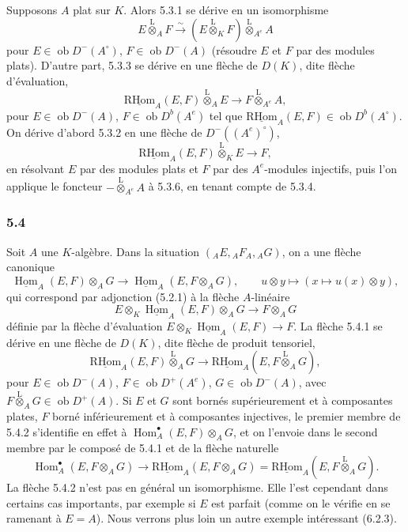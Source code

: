 \documentclass[11pt]{article}
\DeclareMathOperator{\Hom}{Hom}
\newcommand{\ob}{\operatorname{ob}}
\providecommand{\RHom}{\mathrm{RHom}}
\providecommand{\uRHom}{\underline{\RHom}}
\providecommand{\uHom}{\underline{\Hom}}
\providecommand{\lten}{\overset{\mathrm L}{\otimes}}
\providecommand{\RHom}{\mathrm{RHom}}
\providecommand{\Hom}{\operatorname{Hom}}
\providecommand{\ob}{\operatorname{ob}}
\providecommand{\lten}{\overset{\mathrm L}{\otimes}}
\providecommand{\RHom}{\mathrm R\mathcal{H}om}
\providecommand{\lten}{\overset{\mathrm L}{\otimes}}
\providecommand{\lten}{\overset{\mathrm L}{\otimes}}
\providecommand{\lten}{\overset{\mathrm L}{\otimes}}
\providecommand{\lten}{\overset{\mathrm L}{\otimes}}
\providecommand{\RHom}{\mathrm{RHom}}
\providecommand{\Hom}{\operatorname{Hom}}
\providecommand{\lten}{\overset{\mathrm L}{\otimes}}
\begin{document}
Supposons $A$ plat sur $K$. Alors 5.3.1 se dérive en un isomorphisme
\begin{equation}\tag{5.3.4}
E\lten_AF\xrightarrow{\sim}(E\lten_KF)\lten_{A^e}A
\end{equation}
pour $E\in\ob D^-(A^\circ)$, $F\in\ob D^-(A)$ (résoudre $E$ et $F$ par des modules plats). D'autre part, 5.3.3 se dérive en une flèche de $D(K)$, dite flèche d'évaluation,
\begin{equation}\tag{5.3.5}
\uRHom_A(E,F)\lten_AE\longrightarrow F\lten_{A^e}A,
\end{equation}
pour $E\in\ob D^-(A)$, $F\in\ob D^b(A^e)$ tel que $\uRHom_A(E,F)\in\ob D^b(A^\circ)$. On dérive d'abord 5.3.2 en une flèche de $D^-((A^e)^\circ)$,
\begin{equation}\tag{5.3.6}
\uRHom_A(E,F)\lten_KE\longrightarrow F,
\end{equation}
en résolvant $E$ par des modules plats et $F$ par des $A^e$-modules injectifs, puis l'on applique le foncteur $-\lten_{A^e}A$ à 5.3.6, en tenant compte de 5.3.4.

\subsubsection*{5.4}

Soit $A$ une $K$-algèbre. Dans la situation $({}_AE,{}_AF_A,{}_AG)$, on a une flèche canonique
\begin{equation}\tag{5.4.1}
\uHom_A(E,F)\otimes_AG\longrightarrow\uHom_A(E,F\otimes_AG),
\qquad u\otimes y\longmapsto(x\longmapsto u(x)\otimes y),
\end{equation}
qui correspond par adjonction (5.2.1) à la flèche $A$-linéaire
\[
E\otimes_K\uHom_A(E,F)\otimes_AG\longrightarrow F\otimes_AG
\]
définie par la flèche d'évaluation $E\otimes_K\uHom_A(E,F)\to F$. La flèche 5.4.1 se dérive en une flèche de $D(K)$, dite flèche de produit tensoriel,
\begin{equation}\tag{5.4.2}
\uRHom_A(E,F)\lten_AG\longrightarrow\uRHom_A(E,F\lten_AG),
\end{equation}
pour $E\in\ob D^-(A)$, $F\in\ob D^+(A^e)$, $G\in\ob D^-(A)$, avec $F\lten_AG\in\ob D^+(A)$. Si $E$ et $G$ sont bornés supérieurement et à composantes plates, $F$ borné inférieurement et à composantes injectives, le premier membre de 5.4.2 s'identifie en effet à $\Hom_A^\bullet(E,F)\otimes_AG$, et on l'envoie dans le second membre par le composé de 5.4.1 et de la flèche naturelle
\[
\Hom_A^\bullet(E,F\otimes_AG)\longrightarrow \uRHom_A(E,F\otimes_AG)=\uRHom_A(E,F\lten_AG).
\]
La flèche 5.4.2 n'est pas en général un isomorphisme. Elle l'est cependant dans certains cas importants, par exemple si $E$ est parfait (comme on le vérifie en se ramenant à $E=A$). Nous verrons plus loin un autre exemple intéressant (6.2.3).
\end{document}
